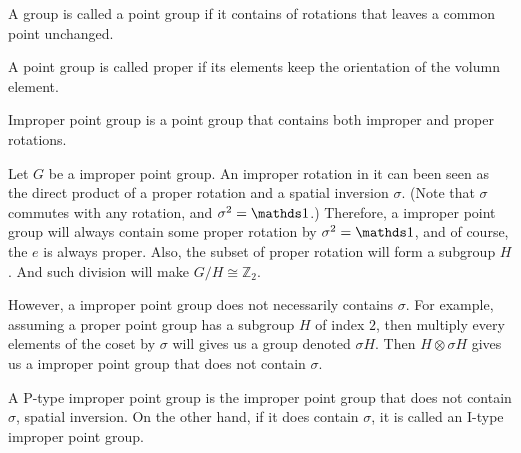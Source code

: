 \begin{defi}
    A group is called a point group if it contains of rotations
    that leaves a common point unchanged.
\end{defi}
\begin{defi}
    A point group is called proper if its elements keep the orientation of the
    volumn element.
\end{defi}
\begin{defi}
    Improper point group is a point group that contains both improper
    and proper rotations.
\end{defi}
\begin{defi}
    
\end{defi}
\begin{remark}
    Let $G$ be a improper point group.
    An improper rotation in it can been seen as the direct product of a
    proper rotation and a spatial inversion $\sigma$. (Note that
    $\sigma$ commutes with any rotation, and $\sigma^2=\id$.)
    Therefore, a improper point group will always contain some proper
    rotation by $\sigma^2=\id$, and of course, the $e$ is always
    proper. Also, the subset of proper rotation will form a subgroup
    $H$. And such division will make $G/H \cong \mathbb{Z}_2$.
\end{remark}
However, a improper point group does not necessarily contains
$\sigma$. For example, assuming a proper point group has a subgroup
$H$ of index $2$, then multiply every elements of the coset by
$\sigma$ will gives us a group denoted $\sigma H$. Then $H\otimes
\sigma H$ gives us a improper point group that does not contain
$\sigma$.

\begin{defi}
    A P-type improper point group is the improper point group that
    does not contain $\sigma$, spatial inversion. On the other hand,
    if it does contain $\sigma$, it is called an I-type improper point
    group.
\end{defi}

